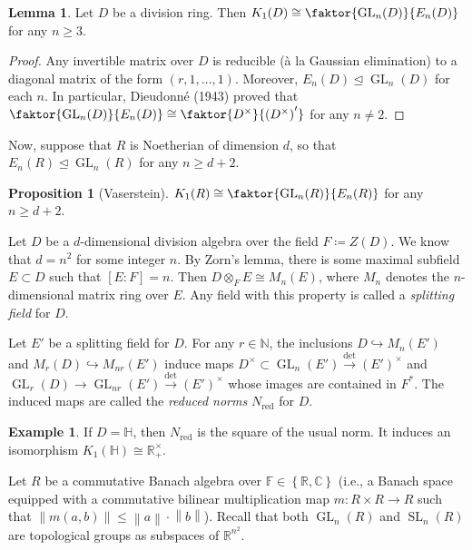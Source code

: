 \documentclass[10pt,letterpaper,cm]{nupset}
\theoremstyle{definition}
\newtheorem{exmp}[definition]{Example}
\theoremstyle{theorem}
\newtheorem{lemma}[definition]{Lemma}
\newtheorem{prop}[definition]{Proposition}
\theoremstyle{remark}
\newcommand{\C}{\mathbb C}
\renewcommand{\H}{\mathbb H}
\newcommand{\N}{\mathbb N}
\newcommand{\R}{\mathbb R}
\newcommand{\1}{\mathbf{1}}
\newcommand{\0}{\vec 0}
\DeclareMathOperator*{\GL}{GL}
\DeclareMathOperator*{\SL}{SL}
\DeclareMathOperator{\red}{red}
\begin{document}
\begin{lemma}
Let $D$ be a division ring. Then $K_1(D) \cong \faktor{\GL_n(D)}{E_n(D)}$ for any $n\geq 3$.
\end{lemma}
\begin{proof}
Any invertible matrix over $D$ is reducible (\`a la Gaussian elimination) to a diagonal matrix of the form $\left(r, 1, \ldots, 1\right)$. Moreover, $E_n(D)\unlhd \GL_n(D)$ for each $n$. In particular, Dieudonn\'e (1943) proved that  $\faktor{\GL_n(D)}{E_n(D)} \cong \faktor{D^{\times}}{\left(D^{\times}\right)'}$ for any $n\ne 2$. 
\end{proof}

\smallskip

Now, suppose that $R$ is Noetherian of dimension $d$, so that $E_n(R)\unlhd \GL_n(R)$ for any $n\geq d+2$. 

\begin{prop}[Vaserstein]
$K_1(R) \cong \faktor{\GL_n(R)}{E_n(R)}$ for any $n \geq d+2$. 
\end{prop}

\medskip


Let $D$ be a $d$-dimensional division algebra over the field $F\coloneqq Z(D)$. We know that $d =n^2$ for some integer $n$. By Zorn's lemma, there is some maximal subfield $E\subset D$ such that $[E : F] = n$. Then $D \otimes_F E \cong M_n(E)$, where $M_n$ denotes the $n$-dimensional matrix ring over $E$. Any field with this property is called a \textit{splitting field} for $D$.

Let $E'$ be a splitting field for $D$. For any $r \in \N$, the inclusions $D \hookrightarrow M_n(E')$ and $M_r(D) \hookrightarrow M_{nr}(E')$ induce maps $D^{\times}\subset \GL_n(E') \overset{\det}{\longrightarrow} (E')^{\times}$ and $\GL_r(D)\to \GL_{nr}(E')  \overset{\det}{\longrightarrow} (E')^{\times}$ whose images are contained in $F^{\ast}$. The induced maps are called the \textit{reduced norms} $N_{\red}$ for $D$.

\begin{exmp}
If $D = \H$, then $N_{\red}$ is the square of the usual norm. It induces an isomorphism $K_1(\H) \cong \R_+^{\times}$.
\end{exmp}

\medskip

Let $R$ be a commutative Banach algebra over $\mathbb{F} \in \left\{\R, \C\right\}$ (i.e., a Banach space equipped with a commutative bilinear multiplication map $m : R \times R \to R$ such that $\left\lVert{m(a,b)}\right\rVert \leq \left\lVert{a}\right\rVert\cdot \left\lVert{b}\right\rVert$). Recall that both $\GL_n(R)$ and $\SL_n(R)$ are topological groups as subspaces of $\R^{n^2}$. 
\end{document}
